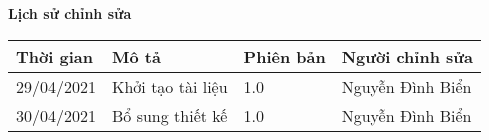 \documentclass[./main.tex]{subfiles}
\begin{document}
\begin{center}
	\Large{\textbf{Lịch sử chỉnh sửa}}
	\begin{table}[H]
		\begin{tabular}{|p{}|p{}|p{}|p{}|}
			\hline
			\textbf{Thời gian} & \textbf{Mô tả}    & \textbf{Phiên bản} & \textbf{Người chỉnh sửa} \\ \hline
			29/04/2021         & Khởi tạo tài liệu & 1.0                & Nguyễn Đình Biển         \\ \hline
			30/04/2021         & Bổ sung thiết kế  & 1.0                & Nguyễn Đình Biển         \\ \hline
		\end{tabular}
	\end{table}
\end{center}
\end{document}
